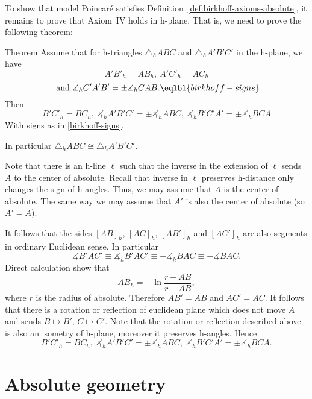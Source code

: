 To show that model Poincar\'e satisfies Definition~\ref{def:birkhoff-axioms-absolute},
it remains to prove that Axiom~IV holds in h-plane.
That is, we need to prove the following theorem:

\begin{thm}{Theorem}
Assume that for h-triangles $\triangle_h A B C$ and $\triangle_h A' B' C'$ in the h-plane, we have
$$A' B'_h= A B_h,
\ A' C'_h= A C_h$$
$$\ \text{and}\ 
\measuredangle_h C' A' B'=\pm\measuredangle_h C A B.\eqlbl{birkhoff-signs}$$
Then 
$$ B' C'_h= B C_h,
\ \measuredangle_h A' B' C'=\pm\measuredangle_h A B C,
\ \measuredangle_h B' C' A'=\pm\measuredangle_h B  C A $$
With signs as in \ref{birkhoff-signs}.

In particular $\triangle_h A B C\cong\triangle_h A' B' C'$.
\end{thm}


Note that there is an h-line $\ell$ such that the inverse in the extension of $\ell$ sends $A$ to the center of absolute.
Recall that inverse in $\ell$ preserves h-distance only changes the sign of h-angles.%
Thus, we may assume that $A$ is the center of absolute.
The same way we may assume that $A'$ is also the center of absolute (so $A'=A$).

It follows that the sides $[AB]_h$, $[AC]_h$, $[AB']_h$ and $[AC']_h$ are also segments in ordinary Euclidean sense.
In particular 
$$\measuredangle B'AC'\equiv\measuredangle_h B'AC'\equiv\pm\measuredangle_h BAC\equiv\pm\measuredangle BAC.$$
Direct calculation show that 
$$AB_h=-\ln\frac{r-AB}{r+AB},$$
where $r$ is the radius of absolute.
Therefore $A B'=AB$ and $A C'=AC$.
It follows that there is a rotation or reflection of euclidean plane which does not move $A$ and sends $B\mapsto B'$, $C\mapsto C'$.
Note that the rotation or reflection described above is also an isometry of h-plane,
moreover it preserves h-angles.
Hence   
$$ B' C'_h= B C_h,
\ \measuredangle_h A' B' C'=\pm\measuredangle_h A B C,
\ \measuredangle_h B' C' A'=\pm\measuredangle_h B  C A.$$
\qedsf













\section{Absolute geometry}






